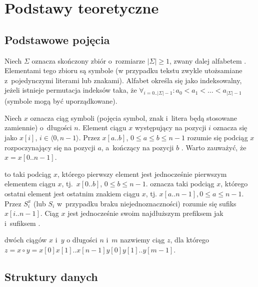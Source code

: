 \chapter{Podstawy teoretyczne}


\section{Podstawowe pojęcia}

Niech $\Sigma$ oznacza skończony zbiór o~rozmiarze $|\Sigma| \geq 1$, zwany
dalej alfabetem \cite{taxonomy}. Elementami tego zbioru są symbole (w przypadku tekstu
zwykle utożsamiane z~pojedynczymi literami lub znakami). Alfabet określa się
jako indeksowalny, jeżeli istnieje permutacja indeksów taka, że
$\forall_{i=0..|\Sigma|-1}: a_0 < a_1 < \dots < a_{|\Sigma|-1}$
(symbole mogą być uporządkowane).

Niech $x$ oznacza ciąg symboli (pojęcia symbol, znak i~litera będą
stosowane zamiennie) o~długości $n$.
Element ciągu $x$ występujący na pozycji $i$ oznacza się jako $x[i]$, $i \in
\langle0, n-1\rangle$.
Przez $x[a..b]$, $0 \leq a \leq b \leq n-1$ rozumie się
podciąg $x$ rozpoczynający się na pozycji $a$, a~kończący na pozycji $b$ \cite{gusfield}.
Warto zauważyć, że $x = x[0..n-1]$.

 to taki podciąg $x$, którego pierwszy element
jest jednocześnie pierwszym elementem ciągu $x$, tj.~$x[0..b]$, $0 \leq b \leq
n-1$.
 oznacza taki podciąg $x$, którego ostatni element jest
ostatnim znakiem ciągu $x$, tj. $x[a..n-1], 0 \leq a \leq n-1$. Przez
$S^{x}_{i}$ (lub $S_i$ w~przypadku braku niejednoznaczności) rozumie się
sufiks $x[i..n-1]$. Ciąg $x$ jest jednocześnie swoim najdłuższym prefiksem jak i~sufiksem \cite{gusfield}.

 dwóch ciągów $x$ i~$y$ o długości $n$ i~$m$ nazwiemy
ciąg $z$, dla którego $z = x \circ y = x[0] x[1] .. x[n-1] y[0] y[1] .. y[m-1]$.


\section{Struktury danych}

